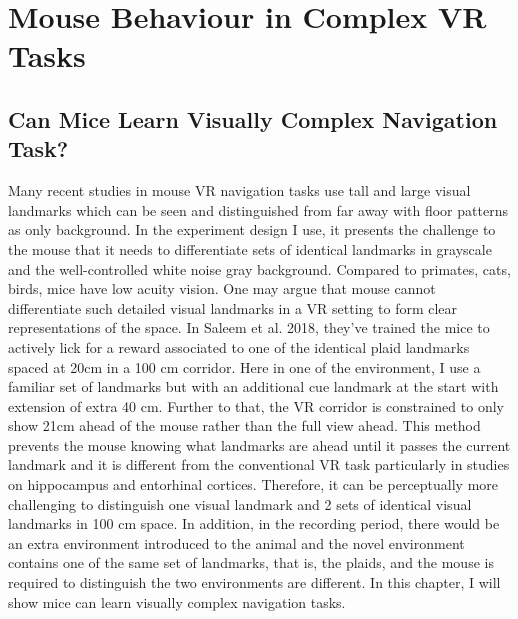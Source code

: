 \chapter{Mouse Behaviour in Complex VR Tasks}
\label{chapterlabel3}

\section{Can Mice Learn Visually Complex Navigation Task?}
 Many recent studies in mouse VR navigation tasks use tall and large visual landmarks which can be seen and distinguished from far away with floor patterns as only background. In the experiment design I use, it presents the challenge to the mouse that it needs to differentiate sets of identical landmarks in grayscale and the well-controlled white noise gray background. Compared to primates, cats, birds, mice have low acuity vision. One may argue that mouse cannot differentiate such detailed visual landmarks in a VR setting to form clear representations of the space. In Saleem et al. 2018, they've trained the mice to actively lick for a reward associated to one of the identical plaid landmarks spaced at 20cm in a 100 cm corridor. Here in one of the environment, I use a familiar set of landmarks but with an additional cue landmark at the start with extension of extra 40 cm. Further to that, the VR corridor is constrained to only show 21cm ahead of the mouse rather than the full view ahead. This method prevents the mouse knowing what landmarks are ahead until it passes the current landmark and it is different from the conventional VR task particularly in studies on hippocampus and entorhinal cortices. Therefore, it can be perceptually more challenging to distinguish one visual landmark and 2 sets of identical visual landmarks in 100 cm space. In addition, in the recording period, there would be an extra environment introduced to the animal and the novel environment contains one of the same set of landmarks, that is, the plaids, and the mouse is required to distinguish the two environments are different. In this chapter, I will show mice can learn visually complex navigation tasks.
